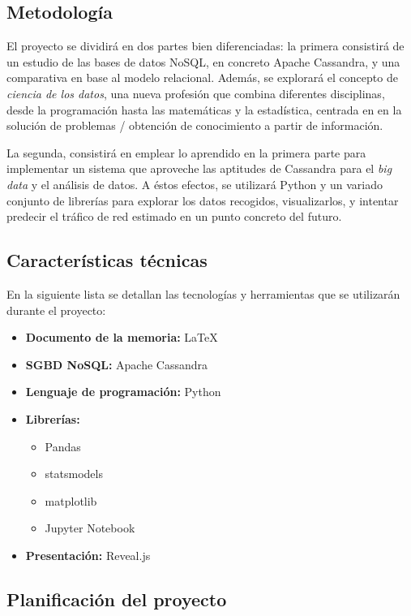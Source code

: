 \subsection{Metodología}
\label{subsec:metodologia}

El proyecto se dividirá en dos partes bien diferenciadas: la primera consistirá
de un estudio de las bases de datos NoSQL, en concreto Apache Cassandra, y una
comparativa en base al modelo relacional. Además, se explorará el concepto de
\emph{ciencia de los datos}, una nueva profesión que combina diferentes
disciplinas, desde la programación hasta las matemáticas y la estadística,
centrada en en la solución de problemas / obtención de conocimiento a partir de información.

La segunda, consistirá en emplear lo aprendido en la primera parte para
implementar un sistema que aproveche las aptitudes de Cassandra para el
\emph{big data} y el análisis de datos. A éstos efectos, se utilizará Python y
un variado conjunto de librerías para explorar los datos recogidos,
visualizarlos, y intentar predecir el tráfico de red estimado en un punto
concreto del futuro.

\subsection{Características técnicas}
\label{subsec:planificació}

En la siguiente lista se detallan las tecnologías y herramientas que se
utilizarán durante el proyecto:

\begin{itemize}
    \item \textbf{Documento de la memoria: } \LaTeX
    \item \textbf{SGBD NoSQL: } Apache Cassandra
    \item \textbf{Lenguaje de programación: } Python 
    \item \textbf{Librerías: } 
      \begin{itemize}
      \item Pandas
      \item statsmodels
      \item matplotlib
      \item Jupyter Notebook
      \end{itemize}
    \item \textbf{Presentación: } Reveal.js
\end{itemize}


\subsection{Planificación del proyecto}
\label{subsec:planificació}

